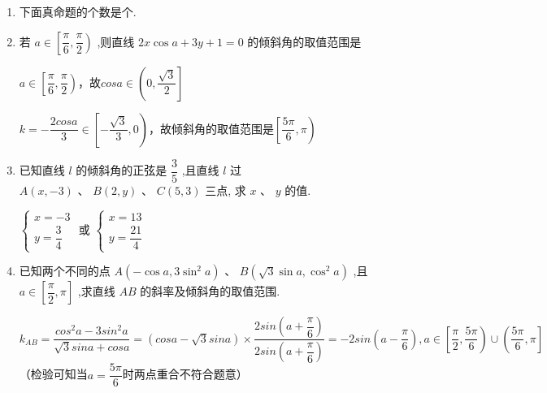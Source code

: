 \begin{enumerate}
    \item 下面真命题的个数是个.
    
    \item 若 $a \in  \left\lbrack  {\dfrac{\pi }{6},\dfrac{\pi }{2}}\right)$ ,则直线 ${2x}\cos a + {3y} + 1 = 0$ 的倾斜角的取值范围是
    \begin{jieda}
        $a \in  \left\lbrack  {\dfrac{\pi }{6},\dfrac{\pi }{2}}\right)$，故$cosa \in \left(0, \dfrac{\sqrt{3}}{2}\right]$
        
        $k = -\dfrac{2cosa}{3} \in \left[-\dfrac{\sqrt{3}}{3}, 0\right)$，故倾斜角的取值范围是$\left[\dfrac{5\pi}{6}, \pi \right)$
    \end{jieda}
    
    \item 已知直线 $l$ 的倾斜角的正弦是 $\dfrac{3}{5}$ ,且直线 $l$ 过 $A\left( {x, - 3}\right) \text{ 、 }B\left( {2,y}\right) \text{ 、 }C\left( {5,3}\right)$ 三点, 求 $x$ 、 $y$ 的值.
    \begin{jieda}
        $\left\{  {\begin{array}{l} x =  - 3 \\  y = \dfrac{3}{4} \end{array}\text{ 或 }\left\{  \begin{array}{l} x = {13} \\  y = \dfrac{21}{4} \end{array}\right. }\right.$
    \end{jieda}

    \item 已知两个不同的点 $A\left( {-\cos a,3{\sin }^{2}a}\right)$ 、 $B\left( {\sqrt{3}\sin a,{\cos }^{2}a}\right)$ ,且 $a \in  \left\lbrack  {\dfrac{\pi }{2},\pi }\right\rbrack$ ,求直线 ${AB}$ 的斜率及倾斜角的取值范围.
    \begin{jieda}
        $k_{AB} = \dfrac{cos^2a - 3sin^2a}{\sqrt{3}sina + cosa} =  (cosa - \sqrt{3}sina) \times \dfrac{2sin\left(a+\dfrac{\pi}{6}\right)}{2sin\left(a+\dfrac{\pi}{6}\right)} = -2sin\left(a - \dfrac{\pi}{6}\right), a \in \left[\dfrac{\pi}{2}, \dfrac{5\pi}{6}\right)\cup \left(\dfrac{5\pi}{6}, \pi\right]$（检验可知当$a = \dfrac{5\pi}{6}$时两点重合不符合题意）


\end{jieda}
\end{enumerate}
